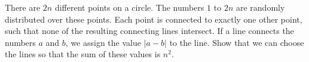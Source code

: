 There are $2n$ different points on a circle. The numbers $1$ to $2n$ are randomly distributed over these points. Each point is connected to exactly one other point, such that none of the resulting connecting lines intersect. If a line connects the numbers $a$ and $b$, we assign the value $|a-b|$ to the line. Show that we can choose the lines so that the sum of these values is $n^2$.
